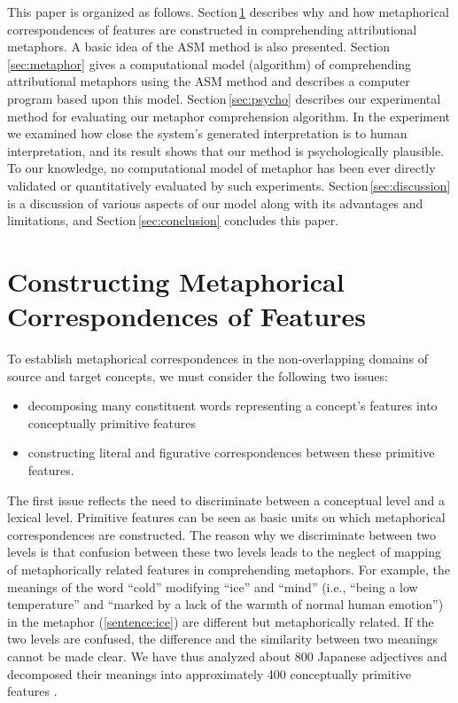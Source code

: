 This paper is organized as follows. Section\,\ref{sec:mapping}
describes why and how metaphorical correspondences of features are
constructed in comprehending attributional metaphors.
A basic idea of the ASM method is also presented.
Section\,\ref{sec:metaphor} gives a computational model (algorithm) 
of comprehending attributional metaphors using the ASM method 
and describes a computer program \SNAME\/ based upon this model. 
Section\,\ref{sec:psycho} describes our experimental method for evaluating 
our metaphor comprehension algorithm.
In the experiment we examined how close the system's generated interpretation is 
to human interpretation, and its result shows that our method is psychologically plausible.
To our knowledge, no computational model of metaphor has been ever
directly validated or quantitatively evaluated by such experiments.
Section\,\ref{sec:discussion} is a discussion of 
various aspects of our model along with its advantages and
limitations, and Section\,\ref{sec:conclusion} concludes this paper.

\section{Constructing Metaphorical Correspondences of Features} \label{sec:mapping}
To establish metaphorical correspondences in the non-overlapping
domains of source and target concepts, we must consider the
following two issues:
\begin{itemize}
\item decomposing many constituent words representing a concept's features into
  conceptually primitive features
\item constructing literal and figurative correspondences between these primitive
  features.
\end{itemize}

The first issue reflects the need to discriminate between a conceptual level
and a lexical level. Primitive features can be seen as basic units 
on which metaphorical correspondences are constructed.  
The reason why we discriminate between two levels is
that confusion between these two levels leads to the neglect of
mapping of metaphorically related features in comprehending metaphors.
For example, the meanings of the word ``cold'' modifying ``ice'' and ``mind''
(i.e., ``being a low temperature'' and ``marked by a lack of the warmth of normal human
emotion'') in the metaphor (\ref{sentence:ice}) are different but metaphorically related.
If the two levels are confused, 
the difference and the similarity between two meanings cannot be made clear.
We have thus analyzed about 800 Japanese adjectives and 
decomposed their meanings into approximately 400 conceptually 
primitive features \cite{Utsumi93}.  

